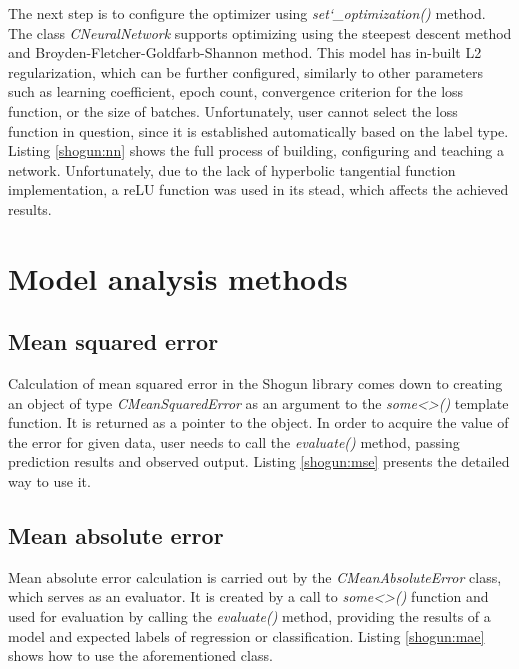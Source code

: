 The next step is to configure the optimizer using \textit{set\char`_optimization()} method. The class \textit{CNeuralNetwork} supports optimizing using the steepest descent method and Broyden-Fletcher-Goldfarb-Shannon method. This model has in-built L2 regularization, which can be further configured, similarly to other parameters such as learning coefficient, epoch count, convergence criterion for the loss function, or the size of batches. Unfortunately, user cannot select the loss function in question, since it is established automatically based on the label type. Listing \ref{shogun:nn} shows the full process of building, configuring and teaching a network. Unfortunately, due to the lack of hyperbolic tangential function implementation, a reLU function was used in its stead, which affects the achieved results.


\section{Model analysis methods}

\subsection{Mean squared error}

Calculation of mean squared error in the Shogun library comes down to creating an object of type \textit{CMeanSquaredError} as an argument to the \textit{some<>()} template function. It is returned as a pointer to the object. In order to acquire the value of the error for given data, user needs to call the \textit{evaluate()} method, passing prediction results and observed output. Listing \ref{shogun:mse} presents the detailed way to use it.



\subsection{Mean absolute error}

Mean absolute error calculation is carried out by the \textit{CMeanAbsoluteError} class, which serves as an evaluator. It is created by a call to \textit{some<>()} function and used for evaluation by calling the \textit{evaluate()} method, providing the results of a model and expected labels of regression or classification. Listing \ref{shogun:mae} shows how to use the aforementioned class.

